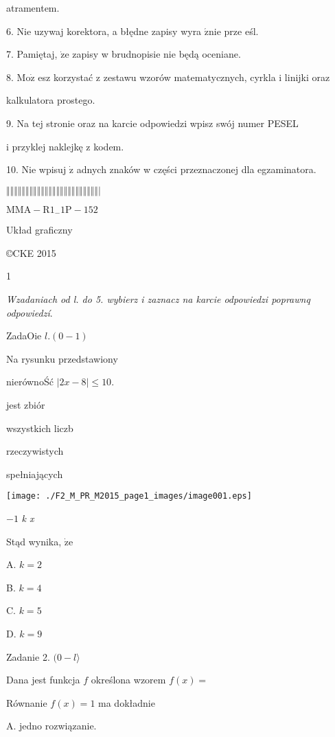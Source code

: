 \documentclass[a4paper,12pt]{article}
\begin{document}
atramentem.

6. Nie uzywaj korektora, a błędne zapisy wyra $\acute{\mathrm{z}}\mathrm{n}\mathrm{i}\mathrm{e}$ prze eśl.

7. Pamiętaj, $\dot{\mathrm{z}}\mathrm{e}$ zapisy w brudnopisie nie będą oceniane.

8. $\mathrm{M}\mathrm{o}\dot{\mathrm{z}}$ esz korzystać z zestawu wzorów matematycznych, cyrkla i linijki oraz

kalkulatora prostego.

9. Na tej stronie oraz na karcie odpowiedzi wpisz swój numer PESEL

i przyklej naklejkę z kodem.

10. Nie wpisuj $\dot{\mathrm{z}}$ adnych znaków w części przeznaczonej dla egzaminatora.

$\Vert\Vert\Vert\Vert\Vert\Vert\Vert\Vert\Vert\Vert\Vert\Vert\Vert\Vert\Vert\Vert\Vert\Vert\Vert\Vert\Vert\Vert\Vert\Vert|$

$\mathrm{M}\mathrm{M}\mathrm{A}-\mathrm{R}1_{-}1\mathrm{P}-152$

Układ graficzny

\copyright CKE 2015

1




{\it Wzadaniach od l. do 5. wybierz i zaznacz na karcie odpowiedzi poprawnq odpowiedzí}.

ZadaOie $l.(0-1)$

Na rysunku przedstawiony

nierównoŚć $|2x-8|\leq 10.$

jest zbiór

wszystkich liczb

rzeczywistych

spełniających
\begin{center}
\texttt{[image: ./F2\_M\_PR\_M2015\_page1\_images/image001.eps]}
\end{center}
$-1$  {\it k  x}

Stąd wynika, $\dot{\mathrm{z}}\mathrm{e}$

A. $k=2$

B. $k=4$

C. $k=5$

D. $k=9$

Zadanie 2. $(0-l\rangle$

Dana jest funkcja $f$ określona wzorem $f(x)=$

Równanie $f(x)=1$ ma dokładnie

A. jedno rozwiązanie.
\end{document}

